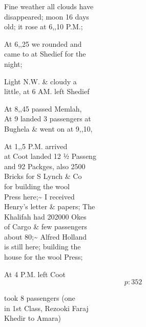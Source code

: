 \documentclass{report}
\begin{document}

	\par{
 	Fine weather all clouds have\ \\disappeared; moon 16 days\ \\old; it rose at 6,,10 P.M.;\ \\
	}

	\par{
 	At 6,,25 we rounded and\ \\came to at Shedief for the\ \\night;\ \\
	}

	\par{
 	Light N.W. \& cloudy a\ \\little, at 6 AM. left Shedief\ \\
	}

	\par{
 	At 8,,45 passed Memlah,\ \\At 9 landed 3 passengers at\ \\Bughela \& went on at 9,,10,\ \\
	}

	\par{
 	At 1,,5 P.M. arrived\ \\at Coot landed 12 ½ Passeng\ \\and 92 Packges, also 2500\ \\Bricks for S Lynch \& Co\ \\for building the wool\ \\Press here;\~{} I received\ \\Henry’s letter \& papers; The\ \\Khalifah had 202000 Okes\ \\of Cargo \& few passengers\ \\about 80;\~{} Alfred Holland\ \\is still here; building the\ \\house for the wool Press;\ \\
	}

	\par{
 	At 4 P.M. left Coot\ \\
  \[p: 352 \]

	}

	\par{
 	took 8 passengers (one\ \\in 1st Class, Rezooki Faraj\ \\Khedir to Amara)\ \\
	}
\end{document}
